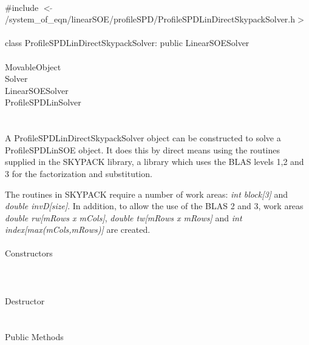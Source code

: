
   \\
\indent \#include $<\tilde{ }$/system\_of\_eqn/linearSOE/profileSPD/ProfileSPDLinDirectSkypackSolver.h$>$  \\

  \\
\indent class ProfileSPDLinDirectSkypackSolver: public LinearSOESolver  \\

 \\
\indent MovableObject \\
\indent\indent  Solver \\
\indent\indent\indent LinearSOESolver \\
\indent\indent\indent\indent ProfileSPDLinSolver \\
\indent\indent\indent\indent{} \\

  \\
\indent A ProfileSPDLinDirectSkypackSolver object can be constructed
to solve a ProfileSPDLinSOE object. It does this by direct means using
the routines supplied in the SKYPACK library, a library which uses the
BLAS levels 1,2 and 3 for the factorization and substitution. 

The routines in SKYPACK require a number of work areas: {\em int
block[3]} and {\em double invD[size]}. In addition, to allow the use
of the BLAS 2 and 3, work areas {\em double rw[mRows x mCols]}, {\em
double tw[mRows x mRows]} and {\em int index[max(mCols,mRows)]} are 
created. \\


  \\
\indent\indent Constructors \\
\indent{}  \\ 
\indent{}  \\ \\
\indent\indent Destructor \\
\indent{}\\  \\
\indent\indent Public Methods \\
\indent{} \\
\indent{} \\
\indent{}\\ 
\indent{}\\ 



